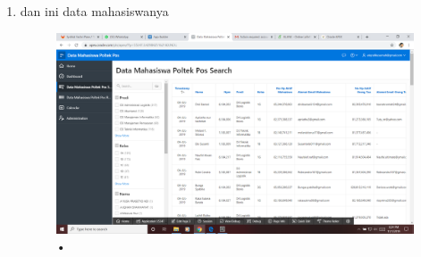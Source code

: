 \documentclass[12pt, times new roman, a4paper]{article}
\begin{document}
\begin{enumerate}
\\
\\
\\
\\
\\
\\
\\
\\
\\
\item dan ini data mahasiswanya
\begin{figure}[h]
	\centering
		\includegraphics[scale=0.2]{Gambar/Capture17}
	\caption{•}
\end{figure}
\end{enumerate}
\end{document}
